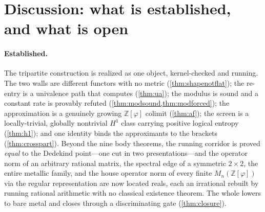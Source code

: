 \documentclass[11pt,letterpaper]{article}
\theoremstyle{plain}
\theoremstyle{definition}
\theoremstyle{remark}
\newcommand{\ZZ}{\mathbb{Z}}
\newcommand{\Zphi}{\ZZ[\varphi]}
\begin{document}
\section{Discussion: what is established, and what is open}\label{sec:discussion}

\paragraph{Established.}
The tripartite construction is realized as one object, kernel-checked and
running. The two walls are different functors with no metric
(\cref{thm:shapenotflat}); the re-entry is a univalence path that computes
(\cref{thm:ua}); the modulus is sound and a constant rate is provably refuted
(\cref{thm:modsound,thm:modforced}); the approximation is a genuinely growing
$\Zphi$ colimit (\cref{thm:af}); the screen is a locally-trivial, globally
nontrivial $H^1$ class carrying positive logical entropy (\cref{thm:h1}); and one
identity binds the approximants to the brackets (\cref{thm:crosspart}). Beyond the
nine body theorems, the running corridor is proved \emph{equal} to the Dedekind
point---one cut in two presentations---and the operator norm of an arbitrary rational
matrix, the spectral edge of a symmetric $2\times2$, the entire metallic family, and
the house operator norm of every finite $M_n(\Zphi)$ via the regular representation
are now located reals, each an irrational rebuilt by running rational arithmetic with
no classical existence theorem. The whole lowers to bare metal and closes through a
discriminating gate (\cref{thm:closure}).
\end{document}
